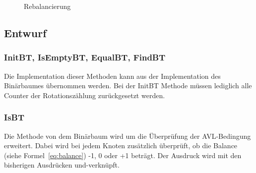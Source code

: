 \begin{figure}[hbt]
\begin{minipage}[c]{.45\textwidth}
{        \label{fig:AVL-Cases}}
    \end{minipage}
    \begin{minipage}[c]{.45\textwidth}
    \end{minipage}
    \caption{Rebalancierung}
\end{figure}

\subsection{Entwurf}\label{subsec:entwurf2}

\subsubsection{InitBT, IsEmptyBT, EqualBT, FindBT}
Die Implementation dieser Methoden kann aus der Implementation des Binärbaumes übernommen werden.
Bei der InitBT Methode müssen lediglich alle Counter der Rotationszählung zurückgesetzt werden.

\subsubsection{IsBT}\label{par:avl-isBT}
Die Methode von dem Binärbaum wird um die Überprüfung der AVL-Bedingung erweitert.
Dabei wird bei jedem Knoten zusätzlich überprüft, ob die Balance (siehe Formel~\ref{eq:balance})
-1, 0 oder +1 beträgt.
Der Ausdruck wird mit den bisherigen Ausdrücken und-verknüpft.


